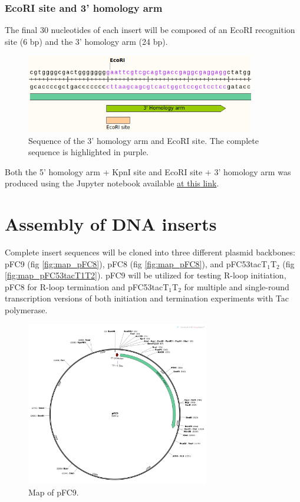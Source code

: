 \documentclass[11pt]{article}
\begin{document}
\subsubsection{EcoRI site and 3' homology arm}

The final 30 nucleotides of each insert will be composed of an EcoRI recognition site (6 bp) and the 3' homology arm (24 bp). 

\begin{figure}[H]
	\includegraphics[width=10cm]{images/variable_region/3_homology_arm.png}
	\centering
	\caption{Sequence of the 3' homology arm and EcoRI site. The complete sequence is highlighted in purple.}
	\label{fig:3_prime_arm}
\end{figure}

Both the 5' homology arm + KpnI site and EcoRI site + 3' homology arm was produced using the Jupyter notebook available \href{https://github.com/EthanHolleman/plasmid-VR-design/blob/main/notes/homology_arms.ipynb}{at this link}.


\section{Assembly of DNA inserts}

Complete insert sequences will be cloned into three different plasmid backbones: pFC9 (fig \ref{fig:map_pFC8}), pFC8 (fig \ref{fig:map_pFC8}), and pFC53tacT$_1$T$_2$ (fig \ref{fig:map_pFC53tacT1T2}). pFC9 will be utilized for testing R-loop initiation, pFC8 for R-loop termination and pFC53tacT$_1$T$_2$ for multiple and single-round transcription versions of both initiation and termination experiments with Tac polymerase. 


\begin{figure}[H]
	\includegraphics[width=8cm]{images/plasmid_maps/pFC9_Map.png}
	\centering
	\caption{Map of pFC9.}
	\label{fig:map_pFC9}
\end{figure}
\end{document}
